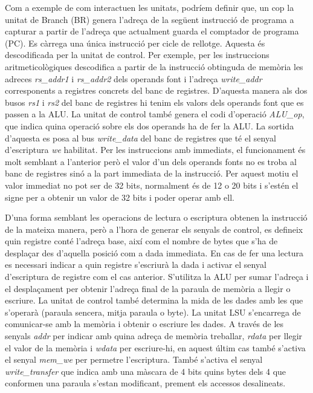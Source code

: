 \documentclass[10pt,a4paper,twocolumn,twoside]{article}
\begin{document}
    Com a exemple de com interactuen les unitats, podríem definir que, un cop la unitat de Branch (BR) genera l’adreça de la següent instrucció de programa a capturar a partir de l'adreça que actualment guarda el comptador de programa (PC). 
    Es càrrega una única instrucció per cicle de rellotge. Aquesta és descodificada per la unitat de control. 
    Per exemple, per les instruccions aritmeticològiques descodifica a partir de la instrucció obtinguda de memòria les adreces \textit{rs\_addr1} i \textit{rs\_addr2} dels operands font i l’adreça \textit{write\_addr} corresponents a registres concrets del banc de registres. 
    D’aquesta manera als dos busos \textit{rs1} i \textit{rs2} del banc de registres hi tenim els valors dels operands font que es passen a la ALU. La unitat de control també genera el codi d’operació \textit{ALU\_op}, que indica quina operació sobre els dos operands ha de fer la ALU. 
    La sortida d’aquesta es posa al bus \textit{write\_data} del banc de registres que té el senyal d’escriptura \textit{we} habilitat. 
    Per les instruccions amb immediats, el funcionament és molt semblant a l’anterior però el valor d’un dels operands fonts no es troba al banc de registres sinó a la part immediata de la instrucció. Per aquest motiu el valor immediat no pot ser de 32 bits, normalment és de 12 o 20 bits i s'estén el signe per a obtenir un valor de 32 bits i poder operar amb ell.

    
    D'una forma semblant les operacions de lectura o escriptura obtenen la instrucció de la mateixa manera, però a l'hora de generar els senyals de control, es defineix quin registre conté l'adreça base, així com el nombre de bytes que s'ha de desplaçar des d'aquella posició com a dada immediata. En cas de fer una lectura es necessari indicar a quin registre s'escriurà la dada i activar el senyal d'escriptura de registre com el cas anterior. S'utilitza la ALU per sumar l'adreça i el desplaçament per obtenir l'adreça final de la paraula de memòria a llegir o escriure. La unitat de control també determina la mida de les dades amb les que s'operarà (paraula sencera, mitja paraula o byte). La unitat LSU s'encarrega de comunicar-se amb la memòria i obtenir o escriure les dades. A través de les senyals \textit{addr} per indicar amb quina adreça de memòria treballar, \textit{rdata} per llegir el valor de la memòria i \textit{wdata} per escriure-hi, en aquest últim cas també s'activa el senyal \textit{mem\_we} per permetre l'escriptura. També s'activa el senyal \textit{write\_transfer} que indica amb una màscara de 4 bits quins bytes dels 4 que conformen una paraula s'estan modificant, prement els accessos desalineats.
    
\end{document}
